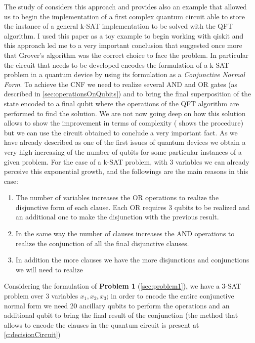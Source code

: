 \documentclass[english]{article}
\begin{document}
				The study of \cite[Ohya M. and Masuda N.]{quantumNP} considers this approach and provides also an example that allowed us to begin the implementation of a first complex quantum circuit able to store the instance of a general k-SAT implementation to be solved with the QFT algorithm. I used this paper as a toy example to begin working with qiskit and this approach led me to a very important conclusion that suggested once more that Grover's algorithm was the correct choice to face the problem. In particular the circuit that needs to be developed encodes the formulation of a k-SAT problem in a quantum device by using its formulation as a \emph{Conjunctive Normal Form}. To achieve the CNF we need to realize several AND and OR gates (as described in \ref{sec:operationsOnQubits}) and to bring the final superposition of the state encoded to a final qubit where the operations of the QFT algorithm are performed to find the solution. We are not now going deep on how this solution allows to show the improvement in terms of complexity (\cite[Ohya M. and Masuda N.]{quantumNP} shows the procedure) but we can use the circuit obtained to conclude a very important fact. As we have already described as one of the first issues of quantum devices we obtain a very high increasing of the number of qubits for some particular instances of a given problem. For the case of a k-SAT problem, with 3 variables we can already perceive this exponential growth, and the followings are the main reasons in this case:
				\begin{enumerate}
					\item The number of variables increases the OR operations to realize the disjunctive form of each clause. Each OR requires 3 qubits to be realized and an additional one to make the disjunction with the previous result.
					
					\item In the same way the number of clauses increases the AND operations to realize the conjunction of all the final disjunctive clauses.
					
					\item In addition the more clauses we have the more disjunctions and conjunctions we will need to realize
				\end{enumerate}
				Considering the formulation of \textbf{Problem 1} (\ref{sec:problem1}), we have a 3-SAT problem over 3 variables $x_1, x_2, x_3$; in order to encode the entire conjunctive normal form we need 20 ancillary qubits to perform the operations and an additional qubit to bring the final result of the conjunction (the method that allows to encode the clauses in the quantum circuit is present at \ref{c:decisionCircuit}) 
\end{document}
